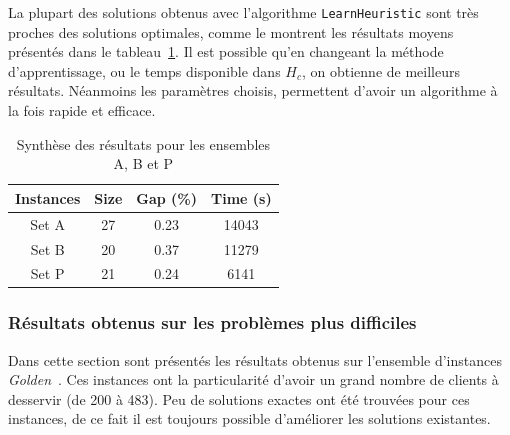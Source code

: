 \documentclass[a4paper,11pt]{article}%
\begin{document}
La plupart des solutions obtenus avec l'algorithme \lstinline|LearnHeuristic| sont très proches des solutions optimales, comme le montrent les résultats moyens présentés dans le tableau~\ref{Synth}. 
Il est possible qu'en changeant la méthode d'apprentissage, ou le temps disponible dans $H_c$, on obtienne de meilleurs résultats. Néanmoins les paramètres choisis, permettent d'avoir un algorithme à la fois rapide et efficace. 

\begin{table}[h!]
\caption{Synthèse des résultats pour les ensembles A, B et P}
\label{Synth}
\begin{center}
\begin{tabular}{|c|c|c|c|}

\hline
 Instances & Size & Gap (\%) & Time (s)  \\
 \hline
 Set A & 27 & 0.23 & 14043  \\
 \hline
 Set B & 20  & 0.37 & 11279   \\
  \hline
  Set P & 21 & 0.24 & 6141   \\
 \hline

\end{tabular}
\end{center}
\end{table}

\subsubsection{Résultats obtenus sur les problèmes plus difficiles}

Dans cette section sont présentés les résultats obtenus sur l'ensemble d'instances \emph{Golden}~\cite{cvrplib}.
Ces instances ont la particularité d'avoir un grand nombre de clients à desservir (de 200 à  483).
Peu de solutions exactes ont été trouvées pour ces instances, de ce fait il est toujours possible d'améliorer les solutions existantes. 
\end{document}
